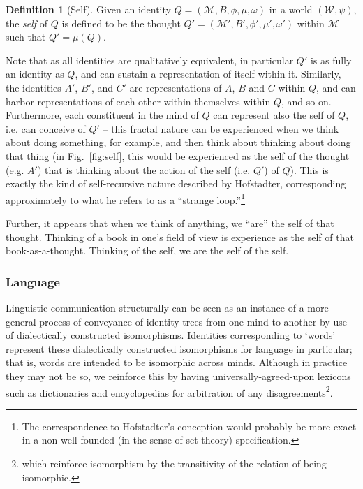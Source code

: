 \documentclass[pra,twocolumn,groupedaddress,10pt]{revtex4}
\theoremstyle{definition}
\newtheorem{defn}{Definition}[section]
\begin{document}
\begin{defn}[Self]
	Given an identity $Q = (\mathcal{M}, B, \phi, \mu, \omega)$ in a world $(\mathcal{W}, \psi)$, the \emph{self} of $Q$ is defined to be the thought $Q' = (\mathcal{M}', B', \phi', \mu', \omega')$ within $\mathcal{M}$ such that $Q' = \mu(Q)$.
\end{defn}

Note that as all identities are qualitatively equivalent, in particular $Q'$ is as fully an identity as $Q$, and can sustain a representation of itself within it. Similarly, the identities $A'$, $B'$, and $C'$ are representations of $A$, $B$ and $C$ within $Q$, and can harbor representations of each other within themselves within $Q$, and so on. Furthermore, each constituent in the mind of $Q$ can represent also the self of $Q$, i.e. can conceive of $Q'$ -- this fractal nature can be experienced when we think about doing something, for example, and then think about thinking about doing that thing (in Fig.~\ref{fig:self}, this would be experienced as the self of the thought (e.g. $A'$) that is thinking about the action of the self (i.e. $Q'$) of $Q$). This is exactly the kind of self-recursive nature described by Hofstadter\cite{geb}, corresponding approximately to what he refers to as a ``strange loop.''\footnote{The correspondence to Hofstadter's conception would probably be more exact in a non-well-founded (in the sense of set theory) specification.}

Further, it appears that when we think of anything, we ``are'' the self of that thought. Thinking of a book in one's field of view is experience as the self of that book-as-a-thought. Thinking of the self, we are the self of the self.

\subsubsection{Language} \label{sec:language}

Linguistic communication structurally can be seen as an instance of a more general process of conveyance of identity trees from one mind to another by use of dialectically constructed isomorphisms. Identities corresponding to `words' represent these dialectically constructed isomorphisms for language in particular; that is, words are intended to be isomorphic across minds. Although in practice they may not be so, we reinforce this by having universally-agreed-upon lexicons such as dictionaries and encyclopedias for arbitration of any disagreements\footnote{which reinforce isomorphism by the transitivity of the relation of being isomorphic.}.
\end{document}

